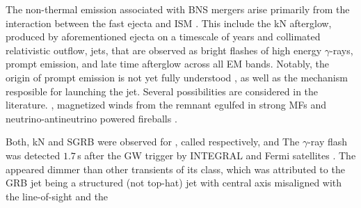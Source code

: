 The non-thermal emission associated with \ac{BNS} mergers arise primarily from the
interaction between the fast ejecta and \ac{ISM} \cite{Kumar:2014upa,Piran:2012wd}. This include the 
\ac{kN} afterglow,
produced by aforementioned ejecta on a timescale of years and collimated 
relativistic outflow, jets, that are observed as bright flashes of high energy $\gamma$-rays, 
prompt emission, and late time afterglow across all \ac{EM} bands. \cite{Eichler:1989ve,Berger:2013jza} 
Notably, the origin of prompt emission is not yet fully understood \cite{Kumar:2014upa},
as well as the mechanism resposible for launching the jet. Several possibilities are 
considered in the literature.  \cite{Blandford:1977ds,Ruiz:2016rai}, magnetized winds 
from the remnant egulfed in strong \acp{MF} \cite{Zhang:2000wx,Bucciantini:2011kx} and neutrino-antineutrino powered 
fireballs \cite{Eichler:1989ve}.

Both, \ac{kN} and \ac{SGRB} were observed for \GW{}, called respectively, \AT{} and \GRB{} 
\cite{kilonova observation list}
\cite{grb observation list}
The $\gamma$-ray flash was detected $1.7\,$s after the \ac{GW} trigger by INTEGRAL and 
Fermi satellites \cite{Monitor:2017mdv}. The \GRB{} appeared dimmer than other transients of its class, 
which was attributed to the \ac{GRB} jet being a structured (not top-hat) jet with central axis
misaligned with the line-of-sight and the 
\cite{Lazzati:2017zsj,Xie:2018vya}\cite{Refs of a struct jet model}



